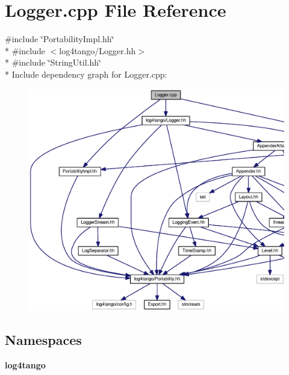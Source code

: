 \section{Logger.\-cpp File Reference}
\label{Logger_8cpp}
{\ttfamily \#include \char`\"{}Portability\-Impl.\-hh\char`\"{}}\\*
{\ttfamily \#include $<$log4tango/\-Logger.\-hh$>$}\\*
{\ttfamily \#include \char`\"{}String\-Util.\-hh\char`\"{}}\\*
Include dependency graph for Logger.\-cpp\-:
\nopagebreak
\begin{figure}[H]
\begin{center}
\leavevmode
\includegraphics[width=350pt]{d7/de6/Logger_8cpp__incl}
\end{center}
\end{figure}
\subsection*{Namespaces}
\begin{DoxyCompactItemize}
\item 
{\bf log4tango}
\end{DoxyCompactItemize}
